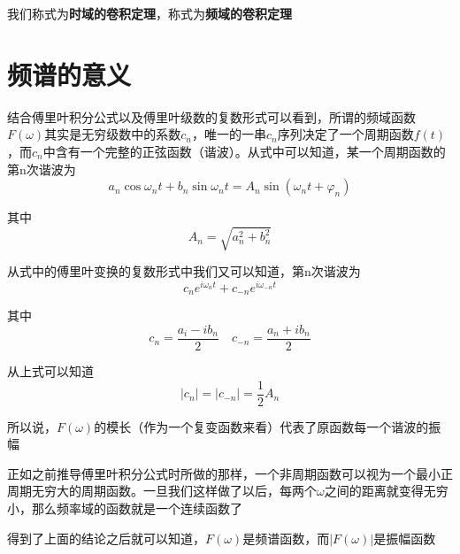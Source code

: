         我们称式为\textbf{时域的卷积定理}，称式为\textbf{频域的卷积定理}

    \section{频谱的意义}
        结合傅里叶积分公式以及傅里叶级数的复数形式可以看到，所谓的频域函数$F(\omega)$其实是无穷级数中的系数$c_n$，唯一的一串$c_n$序列决定了一个周期函数$f(t)$，而$c_n$中含有一个完整的正弦函数（谐波）。从式中可以知道，某一个周期函数的第n次谐波为
        \begin{equation}
            a_n\cos \omega_n t+b_n\sin\omega_n t=A_n\sin(\omega_n t + \varphi_n)
            \label{eq: 1.34}
        \end{equation}

        其中
        \begin{equation}
            A_n = \sqrt{a_n^2+b_n^2}
            \label{eq: 1.35}
        \end{equation}

        从式中的傅里叶变换的复数形式中我们又可以知道，第n次谐波为
        \begin{equation}
            c_ne^{i\omega_nt}+c_{-n}e^{i\omega_{-n}t}
            \label{eq: 1.36}
        \end{equation}

        其中
        \begin{equation}
            c_n=\dfrac{a_i-ib_n}{2}\quad c_{-n} = \dfrac{a_n + ib_n}{2}
            \label{eq: 1.37}
        \end{equation}

        从上式可以知道
        \begin{equation}
            |c_n| = |c_{-n}| = \dfrac 1 2 A_n
            \label{eq: 1.38}
        \end{equation}

        所以说，$F(\omega)$的模长（作为一个复变函数来看）代表了原函数每一个谐波的振幅
        
        正如之前推导傅里叶积分公式时所做的那样，一个非周期函数可以视为一个最小正周期无穷大的周期函数。一旦我们这样做了以后，每两个$\omega$之间的距离就变得无穷小，那么频率域的函数就是一个连续函数了
        
        得到了上面的结论之后就可以知道，$F(\omega)$是频谱函数，而$|F(\omega)|$是振幅函数